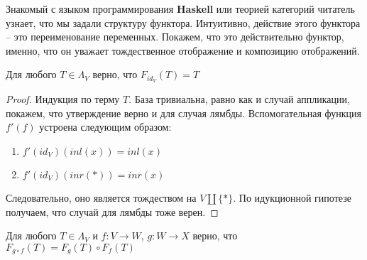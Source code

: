 Знакомый с языком программирования \textbf{Haskell} или теорией категорий читатель узнает, что мы задали структуру функтора. Интуитивно, действие этого функтора -- это переименование переменных. Покажем, что это действительно функтор, именно, что он уважает тождественное отображение и композицию отображений.

\begin{prop}
  Для любого $T \in \Lambda_{V}$ верно, что $F_{id_{V}}(T) = T$
\end{prop}

\begin{proof}
  Индукция по терму $T$. База тривиальна, равно как и случай аппликации, покажем, что утверждение верно и для случая лямбды. Вспомогательная функция $f'(f)$ устроена следующим образом:
  \begin{enumerate}
    \item $f'(id_{V})(inl(x)) = inl(x)$
    \item $f'(id_{V})(inr(*)) = inr(x)$
  \end{enumerate}
  Следовательно, оно является тождеством на $V \coprod \{*\}$. По идукционной гипотезе получаем, что случай для лямбды тоже верен.
\end{proof}

\begin{prop}
  Для любого $T \in \Lambda_{V}$ и $f : V \to W$, $g : W \to X$ верно, что $F_{g \circ f}(T) = F_{g}(T) \circ F_{f}(T)$
\end{prop}

